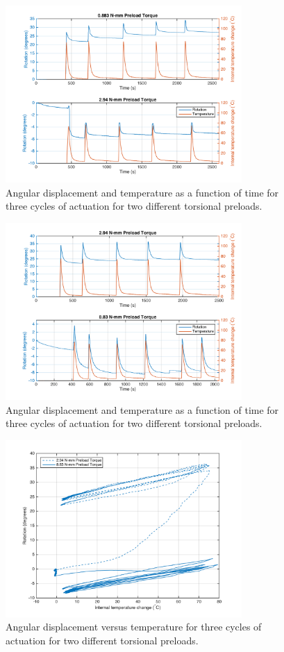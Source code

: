 \documentclass[twocolumn,10pt]{asme2e}
\begin{document}
\begin{figure}
    \centering
        \includegraphics[width=9cm,clip = true, trim = {1cm, 0 ,0 ,0 }]{../Images/TIMEPLOT_030100M.png}
        \caption{Angular displacement and temperature as a function of time for three cycles of actuation for two different torsional preloads. }
        \label{fig:time_hist}
\end{figure}
\begin{figure}
    \centering
        \includegraphics[width=9cm,clip = true, trim = {1cm, 0 ,0 ,0 }]{../Images/TIMEPLOT_100300P.png}
        \caption{Angular displacement and temperature as a function of time for three cycles of actuation for two different torsional preloads. }
        \label{fig:time_hist}
\end{figure}

\begin{figure}
    \centering
        \includegraphics[width=9cm,clip = true, trim = {1cm, 0 ,0 ,0 }]{../Images/ROT_V_TEMP_100300P.png}
        \caption{Angular displacement versus temperature for three cycles of actuation for two different torsional preloads. }
        \label{fig:coiled}
\end{figure}
\end{document}
